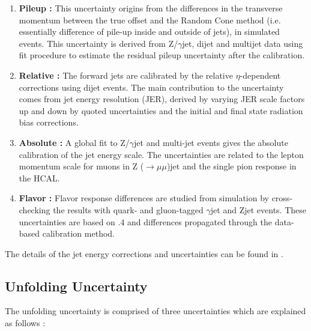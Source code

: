 \begin{enumerate}
\item {\bf Pileup :} This uncertainty origins from the differences in the transverse momentum between the true offset and the Random Cone method (i.e. essentially difference of pile-up inside and outside of jets), in simulated events. This uncertainty is derived from Z/$\gamma$\plusn jet, dijet and multijet data using fit procedure to estimate the residual pileup uncertainty after the calibration. 

\item {\bf Relative :} The forward jets are calibrated by the relative $\eta$-dependent corrections using dijet events. The main contribution to the uncertainty comes from jet energy resolution (JER), derived by varying JER scale factors up and down by quoted uncertainties and the initial and final state radiation bias corrections.

\item {\bf Absolute :} A global fit to Z/$\gamma$\plusn jet and multi-jet events gives the absolute calibration of the jet energy scale. The uncertainties are related to the lepton momentum scale for muons in Z ($\rightarrow\mu\mu$)\plusn jet and the single pion response in the HCAL. 

\item {\bf Flavor :} Flavor response differences are studied from simulation by cross-checking the results with quark- and gluon-tagged $\gamma$\plusn jet and Z\plusn jet events. These uncertainties are based on \PYTHIASn.4 and  differences propagated through the data-based calibration method.   
\end{enumerate}

The details of the jet energy corrections and uncertainties can be found in \cite{JEC}. 

\subsection{Unfolding Uncertainty}
\label{sec:unfolding_unc}

The unfolding uncertainty is comprised of three uncertainties which are explained as follows :

